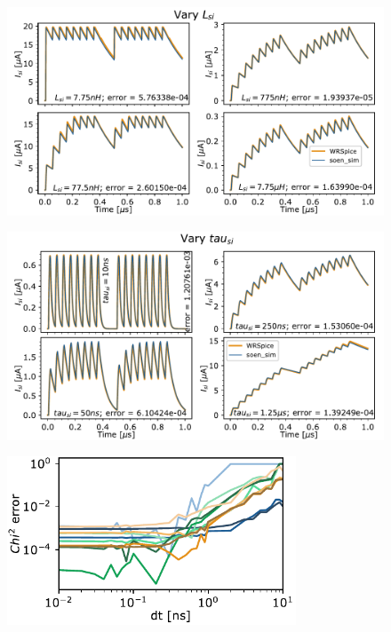 \documentclass[twocolumn]{article}
\begin{document}
\begin{figure}[h!]
\includegraphics[width=17.2cm]{figures/_04__syn__cmpr__vary_Lsi.pdf}
\end{figure}

\begin{figure}[h!]
\includegraphics[width=17.2cm]{figures/_04__syn__cmpr__vary_tausi.pdf}
\end{figure}

\begin{figure}[h!]
\includegraphics[width=8.6cm]{figures/_05__syn__error_vs_dt.pdf}
\end{figure}
\end{document}
